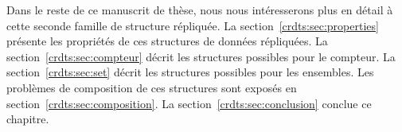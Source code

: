 Dans le reste de ce manuscrit de thèse, nous nous intéresserons plus en détail à
cette seconde famille de structure répliquée. La
section~\ref{crdts:sec:properties} présente les propriétés de ces structures de
données répliquées. La section~\ref{crdts:sec:compteur} décrit les structures
possibles pour le compteur. La section~\ref{crdts:sec:set} décrit les structures
possibles pour les ensembles. Les problèmes de composition de ces structures
sont exposés en section~\ref{crdts:sec:composition}. La
section~\ref{crdts:sec:conclusion} conclue ce chapitre.
